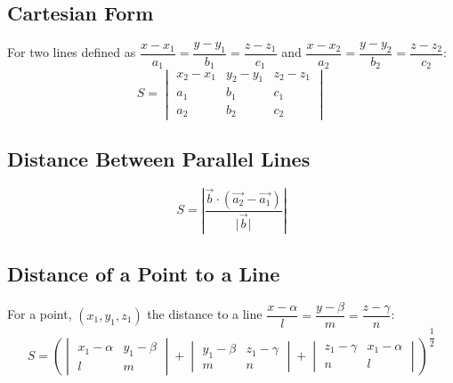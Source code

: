 \subsection{Cartesian Form\newline}
For two lines defined as $\dfrac{x-x_1}{a_1}=\dfrac{y-y_1}{b_1}=\dfrac{z-z_1}{c_1}$ and $\dfrac{x-x_2}{a_2}=\dfrac{y-y_2}{b_2}=\dfrac{z-z_2}{c_2}$:
\begin{equation}
	S=\begin{vmatrix}
		x_2-x_1&y_2-y_1&z_2-z_1\\
		a_1&b_1&c_1\\
		a_2&b_2&c_2
	\end{vmatrix}
\end{equation}

\subsection{Distance Between Parallel Lines\newline}
\begin{equation}
	S=\left| \dfrac{\vec{b}\cdot(\vec{a_2}-\vec{a_1})}{\lvert \vec{b} \rvert} \right|
\end{equation}

\subsection{Distance of a Point to a Line\newline}
For a point, $(x_1,y_1,z_1)$ the distance to a line $\dfrac{x-\alpha}{l}=\dfrac{y-\beta}{m}=\dfrac{z-\gamma}{n}$:
\begin{equation}
	S=\left(
	\begin{vmatrix}
		x_1-\alpha&y_1-\beta\\
		l&m
	\end{vmatrix}+
	\begin{vmatrix}
		y_1-\beta&z_1-\gamma\\
		m&n
	\end{vmatrix}+
	\begin{vmatrix}
		z_1-\gamma&x_1-\alpha\\
		n&l
	\end{vmatrix}
	\right)^{\dfrac{1}{2}}
\end{equation}
